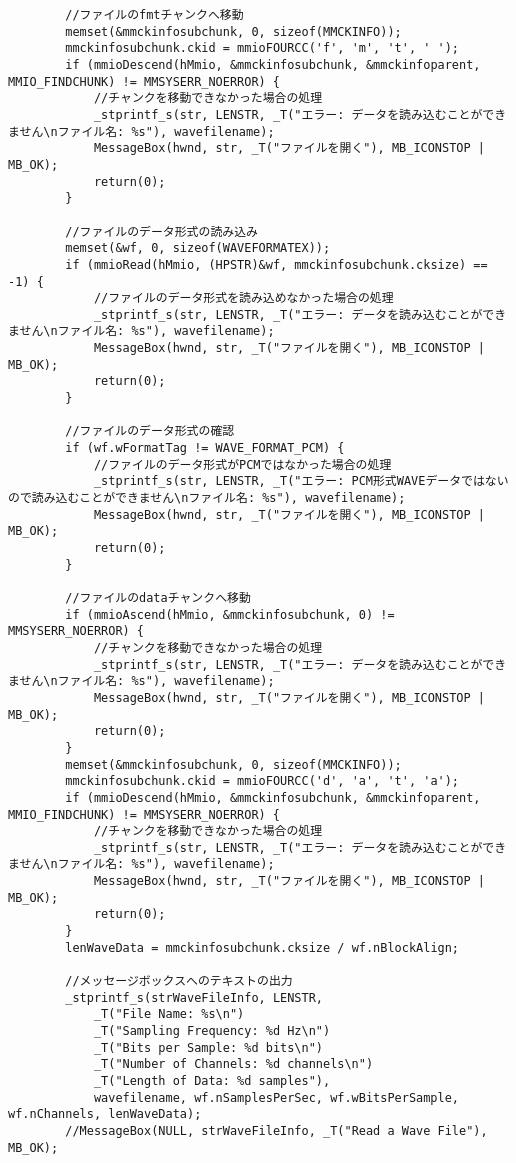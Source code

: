 \begin{verbatim}
		//ファイルのfmtチャンクへ移動
		memset(&mmckinfosubchunk, 0, sizeof(MMCKINFO));
		mmckinfosubchunk.ckid = mmioFOURCC('f', 'm', 't', ' ');
		if (mmioDescend(hMmio, &mmckinfosubchunk, &mmckinfoparent, MMIO_FINDCHUNK) != MMSYSERR_NOERROR) {
			//チャンクを移動できなかった場合の処理
			_stprintf_s(str, LENSTR, _T("エラー: データを読み込むことができません\nファイル名: %s"), wavefilename);
			MessageBox(hwnd, str, _T("ファイルを開く"), MB_ICONSTOP | MB_OK);
			return(0);
		}

		//ファイルのデータ形式の読み込み
		memset(&wf, 0, sizeof(WAVEFORMATEX));
		if (mmioRead(hMmio, (HPSTR)&wf, mmckinfosubchunk.cksize) == -1) {
			//ファイルのデータ形式を読み込めなかった場合の処理
			_stprintf_s(str, LENSTR, _T("エラー: データを読み込むことができません\nファイル名: %s"), wavefilename);
			MessageBox(hwnd, str, _T("ファイルを開く"), MB_ICONSTOP | MB_OK);
			return(0);
		}

		//ファイルのデータ形式の確認
		if (wf.wFormatTag != WAVE_FORMAT_PCM) {
			//ファイルのデータ形式がPCMではなかった場合の処理
			_stprintf_s(str, LENSTR, _T("エラー: PCM形式WAVEデータではないので読み込むことができません\nファイル名: %s"), wavefilename);
			MessageBox(hwnd, str, _T("ファイルを開く"), MB_ICONSTOP | MB_OK);
			return(0);
		}

		//ファイルのdataチャンクへ移動
		if (mmioAscend(hMmio, &mmckinfosubchunk, 0) != MMSYSERR_NOERROR) {
			//チャンクを移動できなかった場合の処理
			_stprintf_s(str, LENSTR, _T("エラー: データを読み込むことができません\nファイル名: %s"), wavefilename);
			MessageBox(hwnd, str, _T("ファイルを開く"), MB_ICONSTOP | MB_OK);
			return(0);
		}
		memset(&mmckinfosubchunk, 0, sizeof(MMCKINFO));
		mmckinfosubchunk.ckid = mmioFOURCC('d', 'a', 't', 'a');
		if (mmioDescend(hMmio, &mmckinfosubchunk, &mmckinfoparent, MMIO_FINDCHUNK) != MMSYSERR_NOERROR) {
			//チャンクを移動できなかった場合の処理
			_stprintf_s(str, LENSTR, _T("エラー: データを読み込むことができません\nファイル名: %s"), wavefilename);
			MessageBox(hwnd, str, _T("ファイルを開く"), MB_ICONSTOP | MB_OK);
			return(0);
		}
		lenWaveData = mmckinfosubchunk.cksize / wf.nBlockAlign;

		//メッセージボックスへのテキストの出力
		_stprintf_s(strWaveFileInfo, LENSTR,
			_T("File Name: %s\n")
			_T("Sampling Frequency: %d Hz\n")
			_T("Bits per Sample: %d bits\n")
			_T("Number of Channels: %d channels\n")
			_T("Length of Data: %d samples"),
			wavefilename, wf.nSamplesPerSec, wf.wBitsPerSample, wf.nChannels, lenWaveData);
		//MessageBox(NULL, strWaveFileInfo, _T("Read a Wave File"), MB_OK);


\end{verbatim}
